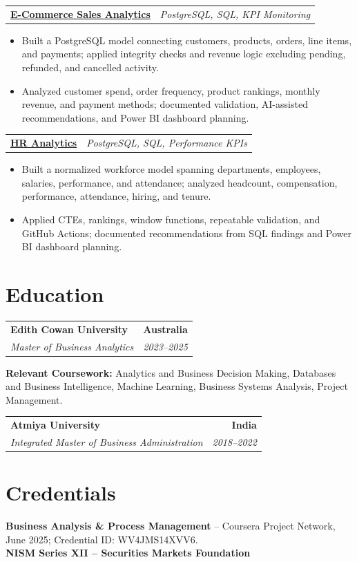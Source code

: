\documentclass[letterpaper,10pt]{article}
\makeatletter
\newcommand{\role}[4]{%
  \begin{tabularx}{\textwidth}{@{}Xr@{}}
    \textbf{#1} & \textbf{#2} \\
    \textit{#3} & \textit{#4}
  \end{tabularx}\vspace{-1pt}
}
\newcommand{\project}[2]{%
  \begin{tabularx}{\textwidth}{@{}Xr@{}}
    \textbf{#1} & \textit{#2}
  \end{tabularx}\vspace{-1pt}
}
\makeatother
\begin{document}
\project{\href{https://github.com/jainalimehta/Ecommerce-Sales-Analytics}{E-Commerce Sales Analytics}}{PostgreSQL, SQL, KPI Monitoring}
\begin{itemize}
  \item Built a PostgreSQL model connecting customers, products, orders, line items, and payments; applied integrity checks and revenue logic excluding pending, refunded, and cancelled activity.
  \item Analyzed customer spend, order frequency, product rankings, monthly revenue, and payment methods; documented validation, AI-assisted recommendations, and Power BI dashboard planning.
\end{itemize}
\vspace{1pt}

\project{\href{https://github.com/jainalimehta/HR-Analytics}{HR Analytics}}{PostgreSQL, SQL, Performance KPIs}
\begin{itemize}
  \item Built a normalized workforce model spanning departments, employees, salaries, performance, and attendance; analyzed headcount, compensation, performance, attendance, hiring, and tenure.
  \item Applied CTEs, rankings, window functions, repeatable validation, and GitHub Actions; documented recommendations from SQL findings and Power BI dashboard planning.
\end{itemize}

\section{Education}
\role{Edith Cowan University}{Australia}{Master of Business Analytics}{2023--2025}
\small\textbf{Relevant Coursework:} Analytics and Business Decision Making, Databases and Business Intelligence, Machine Learning, Business Systems Analysis, Project Management.\\[2pt]
\role{Atmiya University}{India}{Integrated Master of Business Administration}{2018--2022}

\section{Credentials}
\small\textbf{Business Analysis \& Process Management} -- Coursera Project Network, June 2025; Credential ID: WV4JMS14XVV6.\\[-0.2pt]
\small\textbf{NISM Series XII -- Securities Markets Foundation}
\end{document}
